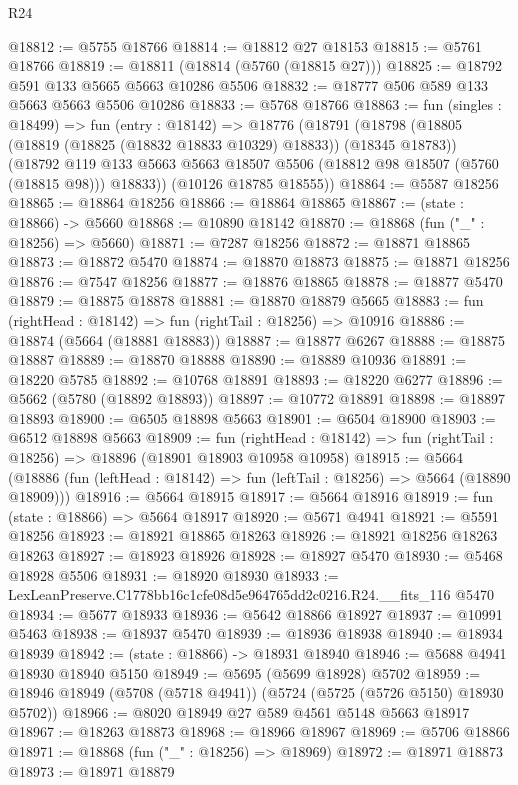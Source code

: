 \begin{lexlean}{R24}
\begin{coremodule}
@18812 := @5755 @18766
@18814 := @18812 @27 @18153
@18815 := @5761 @18766
@18819 := @18811 (@18814 (@5760 (@18815 @27)))
@18825 := @18792 @591 @133 @5665 @5663 @10286 @5506
@18832 := @18777 @506 @589 @133 @5663 @5663 @5506 @10286
@18833 := @5768 @18766
@18863 := fun (singles : @18499) =>
  fun (entry : @18142) =>
  @18776
    (@18791
      (@18798
        (@18805 (@18819 (@18825 (@18832 @18833 @10329) @18833)) (@18345 @18783))
        (@18792 @119 @133 @5663 @5663 @18507 @5506 (@18812 @98 @18507 (@5760 (@18815 @98))) @18833))
      (@10126 @18785 @18555))
@18864 := @5587 @18256
@18865 := @18864 @18256
@18866 := @18864 @18865
@18867 := (state : @18866) -> @5660
@18868 := @10890 @18142
@18870 := @18868 (fun ("_" : @18256) => @5660)
@18871 := @7287 @18256
@18872 := @18871 @18865
@18873 := @18872 @5470
@18874 := @18870 @18873
@18875 := @18871 @18256
@18876 := @7547 @18256
@18877 := @18876 @18865
@18878 := @18877 @5470
@18879 := @18875 @18878
@18881 := @18870 @18879 @5665
@18883 := fun (rightHead : @18142) => fun (rightTail : @18256) => @10916
@18886 := @18874 (@5664 (@18881 @18883))
@18887 := @18877 @6267
@18888 := @18875 @18887
@18889 := @18870 @18888
@18890 := @18889 @10936
@18891 := @18220 @5785
@18892 := @10768 @18891
@18893 := @18220 @6277
@18896 := @5662 (@5780 (@18892 @18893))
@18897 := @10772 @18891
@18898 := @18897 @18893
@18900 := @6505 @18898 @5663
@18901 := @6504 @18900
@18903 := @6512 @18898 @5663
@18909 := fun (rightHead : @18142) =>
  fun (rightTail : @18256) => @18896 (@18901 @18903 @10958 @10958)
@18915 := @5664
    (@18886 (fun (leftHead : @18142) => fun (leftTail : @18256) => @5664 (@18890 @18909)))
@18916 := @5664 @18915
@18917 := @5664 @18916
@18919 := fun (state : @18866) => @5664 @18917
@18920 := @5671 @4941
@18921 := @5591 @18256
@18923 := @18921 @18865 @18263
@18926 := @18921 @18256 @18263 @18263
@18927 := @18923 @18926
@18928 := @18927 @5470
@18930 := @5468 @18928 @5506
@18931 := @18920 @18930
@18933 := LexLeanPreserve.C1778bb16c1cfe08d5e964765dd2c0216.R24.__fits_116 @5470
@18934 := @5677 @18933
@18936 := @5642 @18866 @18927
@18937 := @10991 @5463
@18938 := @18937 @5470
@18939 := @18936 @18938
@18940 := @18934 @18939
@18942 := (state : @18866) -> @18931 @18940
@18946 := @5688 @4941 @18930 @18940 @5150
@18949 := @5695 (@5699 @18928) @5702
@18959 := @18946 @18949 (@5708 (@5718 @4941)) (@5724 (@5725 (@5726 @5150) @18930 @5702))
@18966 := @8020 @18949 @27 @589 @4561 @5148 @5663 @18917
@18967 := @18263 @18873
@18968 := @18966 @18967
@18969 := @5706 @18866
@18971 := @18868 (fun ("_" : @18256) => @18969)
@18972 := @18971 @18873
@18973 := @18971 @18879

\end{coremodule}
\end{lexlean}
